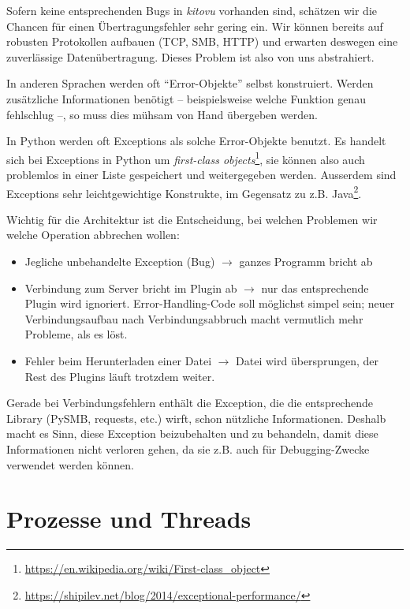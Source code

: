 \documentclass[a4paper]{article}
\let\oldsection\section
\renewcommand\section{\clearpage\oldsection}
\begin{document}
Sofern keine entsprechenden Bugs in \emph{kitovu} vorhanden sind, schätzen wir die
Chancen für einen Übertragungsfehler sehr gering ein. Wir können bereits auf robusten Protokollen aufbauen
(TCP, SMB, HTTP) und erwarten deswegen eine zuverlässige Datenübertragung. Dieses Problem ist also von uns abstrahiert.

In anderen Sprachen werden oft ``Error-Objekte'' selbst konstruiert. Werden
zusätzliche Informationen benötigt -- beispielsweise welche Funktion genau fehlschlug --, so muss dies mühsam von Hand übergeben werden.

In Python werden oft Exceptions als solche Error-Objekte benutzt. Es handelt
sich bei Exceptions in Python um \emph{first-class
  objects}\footnote{\url{https://en.wikipedia.org/wiki/First-class_object}}, sie
können also auch problemlos in einer Liste gespeichert und weitergegeben werden.
Ausserdem sind Exceptions sehr leichtgewichtige Konstrukte, im Gegensatz zu z.B.
Java\footnote{\url{https://shipilev.net/blog/2014/exceptional-performance/}}.

Wichtig für die Architektur ist die Entscheidung, bei welchen Problemen wir
welche Operation abbrechen wollen:

\begin{itemize}
  \item Jegliche unbehandelte Exception (Bug) $\rightarrow$ ganzes Programm bricht ab
  \item Verbindung zum Server bricht im Plugin ab $\rightarrow$ nur das
    entsprechende Plugin wird ignoriert. Error-Handling-Code soll möglichst
    simpel sein; neuer Verbindungsaufbau nach Verbindungsabbruch macht
    vermutlich mehr Probleme, als es löst.
  \item Fehler beim Herunterladen einer Datei $\rightarrow$ Datei wird
    übersprungen, der Rest des Plugins läuft trotzdem weiter.
\end{itemize}

Gerade bei Verbindungsfehlern enthält die Exception, die die entsprechende
Library (PySMB, requests, etc.) wirft, schon nützliche Informationen. Deshalb
macht es Sinn, diese Exception beizubehalten und zu behandeln, damit diese
Informationen nicht verloren gehen, da sie z.B. auch für Debugging-Zwecke verwendet werden können.

\section{Prozesse und Threads}

\end{document}
